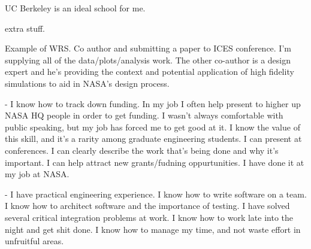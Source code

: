 \documentclass{article}
\begin{document}
UC Berkeley is an ideal school for me. 


extra stuff.

 Example of WRS. Co author and submitting a paper to ICES conference. I'm supplying all of the data/plots/analysis work. The other co-author is a design expert and he's providing the context and potential application of high fidelity simulations to aid in NASA's design process.

  - I know how to track down funding. In my job I often help present to higher up NASA HQ people in order to get funding. I wasn't always comfortable with public speaking, but my job has forced me to get good at it. I know the value of this skill, and it's a rarity among graduate engineering students. I can present at conferences. I can clearly describe the work that's being done and why it's important. I can help attract new grants/fudning oppurtunities. I have done it at my job at NASA. 

  - I have practical engineering experience. I know how to write software on a team. I know how to architect software and the importance of testing. I have solved several critical integration problems at work. I know how to work 
  late into the night and get shit done. I know how to manage my time, and not waste effort in unfruitful areas.
\end{document}
